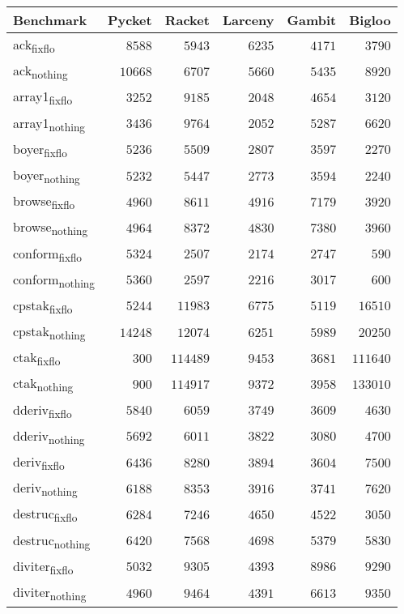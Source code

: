 %

\setlongtables

{\small


\begin{longtable}{l@{}r@{}r@{}r@{}r@{}r}
\toprule
\multicolumn{1}{l}{Benchmark}&\multicolumn{1}{c}{Pycket}&\multicolumn{1}{c}{Racket}&\multicolumn{1}{c}{Larceny}&\multicolumn{1}{c}{Gambit}&\multicolumn{1}{c}{Bigloo}\tabularnewline
\midrule
\endhead
\midrule
\endfoot
ack\textsubscript{fixflo}&$ 8588$&$   5943$&$  6235$&$ 4171$&$  3790$\tabularnewline
ack\textsubscript{nothing}&$10668$&$   6707$&$  5660$&$ 5435$&$  8920$\tabularnewline
array1\textsubscript{fixflo}&$ 3252$&$   9185$&$  2048$&$ 4654$&$  3120$\tabularnewline
array1\textsubscript{nothing}&$ 3436$&$   9764$&$  2052$&$ 5287$&$  6620$\tabularnewline
boyer\textsubscript{fixflo}&$ 5236$&$   5509$&$  2807$&$ 3597$&$  2270$\tabularnewline
boyer\textsubscript{nothing}&$ 5232$&$   5447$&$  2773$&$ 3594$&$  2240$\tabularnewline
browse\textsubscript{fixflo}&$ 4960$&$   8611$&$  4916$&$ 7179$&$  3920$\tabularnewline
browse\textsubscript{nothing}&$ 4964$&$   8372$&$  4830$&$ 7380$&$  3960$\tabularnewline
conform\textsubscript{fixflo}&$ 5324$&$   2507$&$  2174$&$ 2747$&$   590$\tabularnewline
conform\textsubscript{nothing}&$ 5360$&$   2597$&$  2216$&$ 3017$&$   600$\tabularnewline
cpstak\textsubscript{fixflo}&$ 5244$&$  11983$&$  6775$&$ 5119$&$ 16510$\tabularnewline
cpstak\textsubscript{nothing}&$14248$&$  12074$&$  6251$&$ 5989$&$ 20250$\tabularnewline
ctak\textsubscript{fixflo}&$  300$&$ 114489$&$  9453$&$ 3681$&$111640$\tabularnewline
ctak\textsubscript{nothing}&$  900$&$ 114917$&$  9372$&$ 3958$&$133010$\tabularnewline
dderiv\textsubscript{fixflo}&$ 5840$&$   6059$&$  3749$&$ 3609$&$  4630$\tabularnewline
dderiv\textsubscript{nothing}&$ 5692$&$   6011$&$  3822$&$ 3080$&$  4700$\tabularnewline
deriv\textsubscript{fixflo}&$ 6436$&$   8280$&$  3894$&$ 3604$&$  7500$\tabularnewline
deriv\textsubscript{nothing}&$ 6188$&$   8353$&$  3916$&$ 3741$&$  7620$\tabularnewline
destruc\textsubscript{fixflo}&$ 6284$&$   7246$&$  4650$&$ 4522$&$  3050$\tabularnewline
destruc\textsubscript{nothing}&$ 6420$&$   7568$&$  4698$&$ 5379$&$  5830$\tabularnewline
diviter\textsubscript{fixflo}&$ 5032$&$   9305$&$  4393$&$ 8986$&$  9290$\tabularnewline
diviter\textsubscript{nothing}&$ 4960$&$   9464$&$  4391$&$ 6613$&$  9350$\tabularnewline

\end{longtable}}
